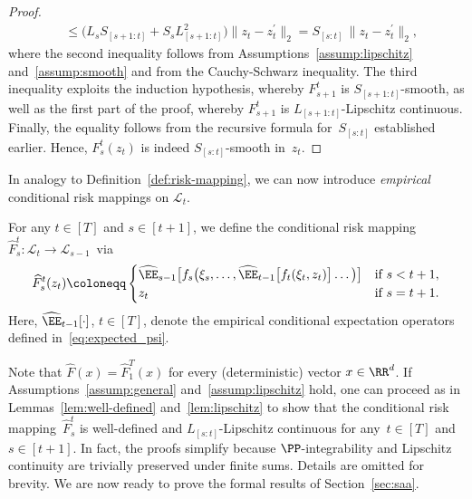 \documentclass[11pt]{article}
\let\hat\widehat
\begin{document}
\begin{proof}
\begin{align*}
    & \leq \big( L_s S_{[s+1:t]} + S_s L_{[s+1:t]}^2 \big) \big\| z_t - z_t^\prime \big\|_2 = S_{[s:t]}\, \big\| z_t - z_t^\prime \big\|_2,
\end{align*}
where the second inequality follows from Assumptions~\ref{assump:lipschitz} and~\ref{assump:smooth} and from the Cauchy-Schwarz inequality. The third inequality exploits the induction hypothesis, whereby $F_{s+1}^t$ is $S_{[s+1:t]}$-smooth, as well as the first part of the proof, whereby $F_{s+1}^t$ is $L_{[s+1:t]}$-Lipschitz continuous. Finally, the equality follows from the recursive formula for~$S_{[s:t]}$ established earlier. Hence, $F_{s}^t(z_t)$ is indeed $S_{[s:t]}$-smooth in~$z_t$.
\end{proof}

In analogy to Definition~\ref{def:risk-mapping}, we can now introduce {\em empirical} conditional risk mappings on $\mathcal L_t$. 
\begin{defn}
\label{def:risk-mapping-hat}
For any $t\in[T]$ and $s\in[t+1]$, we define the conditional risk mapping $\hat F_s^t : \mathcal L_t\to \mathcal L_{s-1}$~via
\begin{align*}
    \hat F_s^t(z_t)\coloneqq \begin{cases}
        \hat \EE_{s-1} \big[f_{s} \big(\xi_{s},\ldots ,\hat \EE_{t-1} \big[ f_t(\xi_t, z_t ) \big] \ldots \big) \big] & \text{if } s<t+1, \\ z_t & \text{if } s=t+1.
    \end{cases}
\end{align*}
Here, $\hat \EE_{t-1}[\cdot]$, $t\in[T]$, denote the empirical conditional expectation operators defined in~\eqref{eq:expected_psi}.
\end{defn}

Note that $\hat F(x)=\hat F_1^T(x)$ for every (deterministic) vector $x\in\RR^d$. If Assumptions~\ref{assump:general} and~\ref{assump:lipschitz} hold, one can proceed as in Lemmas~\ref{lem:well-defined} and~\ref{lem:lipschitz} to show that the conditional risk mapping~$\hat F_s^t$ is well-defined and $L_{[s:t]}$-Lipschitz continuous for any~$t\in [T]$ and~$s\in[t+1]$. In fact, the proofs simplify because  $\PP$-integrability and Lipschitz continuity are trivially preserved under finite sums. Details are omitted for brevity.
We are now ready to prove the formal results of Section~\ref{sec:saa}.
\end{document}
